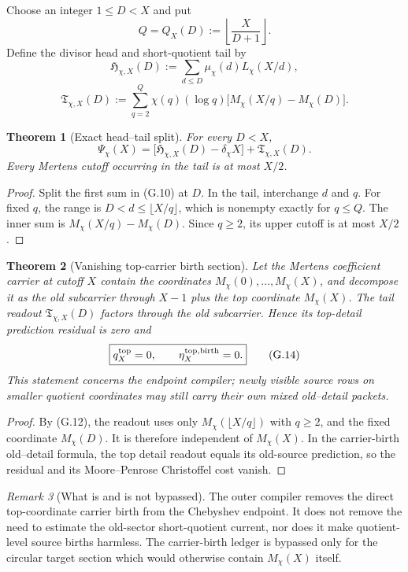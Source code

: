 \documentclass[11pt]{article}
\newtheorem{theorem}{Theorem}[section]
\theoremstyle{definition}
\theoremstyle{remark}
\newtheorem{remark}[theorem]{Remark}
\begin{document}
Choose an integer \(1\le D<X\) and put
\[
 \boxed{
 Q=Q_X(D):=\left\lfloor\frac{X}{D+1}\right\rfloor.}
 \tag{G.11}
\]
Define the divisor head and short-quotient tail by
\[
 \mathfrak H_{\chi,X}(D)
 :=\sum_{d\le D}\mu_\chi(d)L_\chi(X/d),
\]
\[
 \boxed{
 \mathfrak T_{\chi,X}(D)
 :=\sum_{q=2}^{Q}\chi(q)(\log q)
   \bigl[M_\chi(X/q)-M_\chi(D)\bigr].}
 \tag{G.12}
\]

\begin{theorem}[Exact head--tail split]
\label{thm:grhouter-head-tail}
For every \(D<X\),
\[
 \boxed{
 \Psi_\chi(X)
 =\bigl[\mathfrak H_{\chi,X}(D)-\delta_\chi X\bigr]
  +\mathfrak T_{\chi,X}(D).}
 \tag{G.13}
\]
Every Mertens cutoff occurring in the tail is at most \(X/2\).
\end{theorem}

\begin{proof}
Split the first sum in \textup{(G.10)} at \(D\).  In the tail, interchange
\(d\) and \(q\).  For fixed \(q\), the range is
\(D<d\le\lfloor X/q\rfloor\), which is nonempty exactly for \(q\le Q\).
The inner sum is
\(M_\chi(X/q)-M_\chi(D)\).  Since \(q\ge2\), its upper cutoff is at most
\(X/2\).
\end{proof}

\begin{theorem}[Vanishing top-carrier birth section]
\label{thm:grhouter-no-top-birth}
Let the Mertens coefficient carrier at cutoff \(X\) contain the coordinates
\(M_\chi(0),\ldots,M_\chi(X)\), and decompose it as the old subcarrier
through \(X-1\) plus the top coordinate \(M_\chi(X)\).  The tail readout
\(\mathfrak T_{\chi,X}(D)\) factors through the old subcarrier.  Hence its
top-detail prediction residual is zero and
\[
 \boxed{
 q_{X}^{\rm top}=0,
 \qquad
 \eta_{X}^{\rm top,birth}=0.}
 \tag{G.14}
\]
This statement concerns the endpoint compiler; newly visible source rows on
smaller quotient coordinates may still carry their own mixed old--detail
packets.
\end{theorem}

\begin{proof}
By \textup{(G.12)}, the readout uses only
\(M_\chi(\lfloor X/q\rfloor)\) with \(q\ge2\), and the fixed coordinate
\(M_\chi(D)\).  It is therefore independent of \(M_\chi(X)\).  In the carrier-birth
old--detail formula, the top detail readout equals its old-source prediction,
so the residual and its Moore--Penrose Christoffel cost vanish.
\end{proof}

\begin{remark}[What is and is not bypassed]
The outer compiler removes the direct top-coordinate carrier birth from the
Chebyshev endpoint.  It does not remove the need to estimate the old-sector
short-quotient current, nor does it make quotient-level source births
harmless.  The carrier-birth ledger is bypassed only for the circular target
section which would otherwise contain \(M_\chi(X)\) itself.
\end{remark}
\end{document}
